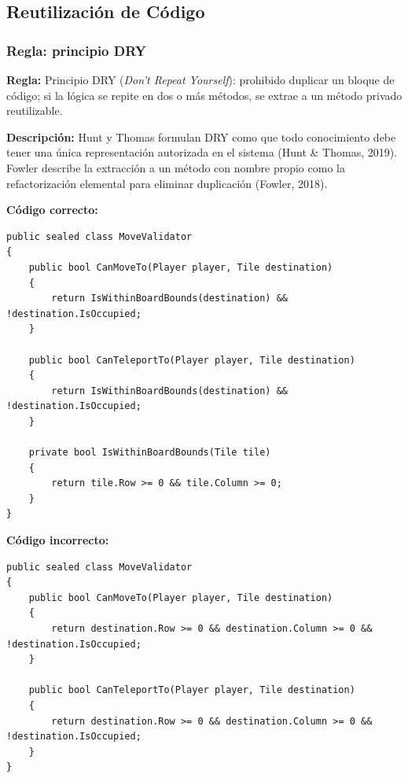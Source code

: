 \subsection{Reutilización de Código}

\subsubsection{Regla: principio DRY}

\textbf{Regla:} Principio DRY (\emph{Don't Repeat Yourself}): prohibido duplicar un bloque de código; si la lógica se repite en dos o más métodos, se extrae a un método privado reutilizable.

\textbf{Descripción:} Hunt y Thomas formulan DRY como que todo conocimiento debe tener una única representación autorizada en el sistema (Hunt \& Thomas, 2019). Fowler describe la extracción a un método con nombre propio como la refactorización elemental para eliminar duplicación (Fowler, 2018).

\textbf{Código correcto:}
\begin{lstlisting}[style=csharpstyle]
public sealed class MoveValidator
{
    public bool CanMoveTo(Player player, Tile destination)
    {
        return IsWithinBoardBounds(destination) && !destination.IsOccupied;
    }

    public bool CanTeleportTo(Player player, Tile destination)
    {
        return IsWithinBoardBounds(destination) && !destination.IsOccupied;
    }

    private bool IsWithinBoardBounds(Tile tile)
    {
        return tile.Row >= 0 && tile.Column >= 0;
    }
}
\end{lstlisting}

\textbf{Código incorrecto:}
\begin{lstlisting}[style=csharpstyle]
public sealed class MoveValidator
{
    public bool CanMoveTo(Player player, Tile destination)
    {
        return destination.Row >= 0 && destination.Column >= 0 && !destination.IsOccupied;
    }

    public bool CanTeleportTo(Player player, Tile destination)
    {
        return destination.Row >= 0 && destination.Column >= 0 && !destination.IsOccupied;
    }
}
\end{lstlisting}
